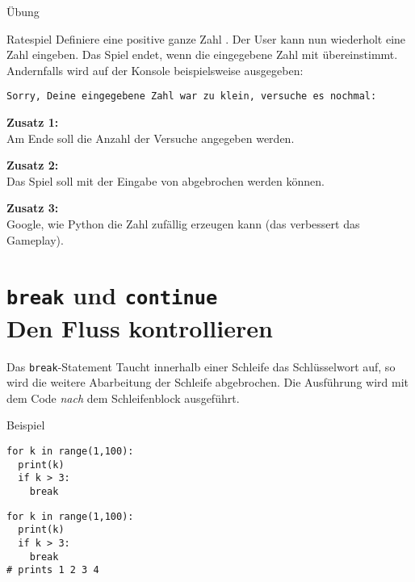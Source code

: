 \begin{frame}{Übung}

\begin{block}{Ratespiel}
\vspace{2pt}
Definiere eine positive ganze Zahl . Der User kann nun wiederholt eine Zahl eingeben. Das Spiel endet, wenn die eingegebene Zahl mit  übereinstimmt. 
Andernfalls wird auf der Konsole beispielsweise ausgegeben: 

\texttt{Sorry, Deine eingegebene Zahl war zu klein, versuche es nochmal: }

\pause
\textbf{Zusatz 1:} \\
Am Ende soll die Anzahl der Versuche angegeben werden.

\pause
\textbf{Zusatz 2:} \\
Das Spiel soll mit der Eingabe von  abgebrochen werden können. 

\pause
\textbf{Zusatz 3:} \\
Google, wie Python die Zahl  zufällig erzeugen kann (das verbessert das Gameplay).  

\end{block}

\end{frame}

\section{\texttt{break} und \texttt{continue} \\ \footnotesize Den Fluss kontrollieren}


\begin{fragile}
	

\begin{block}{Das \texttt{break}-Statement}
Taucht innerhalb einer Schleife das Schlüsselwort  auf, so wird die weitere Abarbeitung der Schleife abgebrochen. Die Ausführung wird mit dem Code \emph{nach} dem Schleifenblock ausgeführt. 		
\end{block}


\vspace{12pt} \pause 


\begin{exampleblock}{Beispiel}
\vspace{2pt}

\begin{overprint}
\begin{verbatim}
for k in range(1,100):
  print(k)
  if k > 3:
    break
\end{verbatim}
\begin{verbatim}
for k in range(1,100):
  print(k)
  if k > 3:
    break
# prints 1 2 3 4 
\end{verbatim}
\end{overprint}

\end{exampleblock}

	
\end{fragile}



